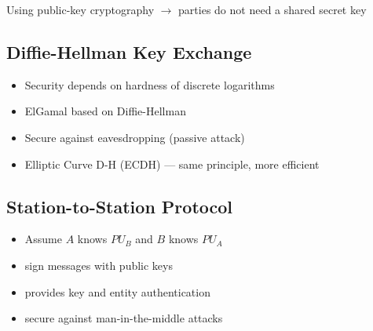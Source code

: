 \documentclass[final]{article}
\begin{document}
Using public-key cryptography $\rightarrow$ parties do not need a shared secret key

\subsection{Diffie-Hellman Key Exchange}
\begin{itemize}[nosep]
    \item Security depends on hardness of discrete logarithms
    \item ElGamal based on Diffie-Hellman
    \item Secure against eavesdropping (passive attack)
    \item Elliptic Curve D-H (ECDH) --- same principle, more efficient
\end{itemize}
\subsection{Station-to-Station Protocol}
\begin{itemize}[nosep]
    \item Assume $A$ knows $PU_B$ and $B$ knows $PU_A$
    \item sign messages with public keys
    \item provides key and entity authentication
    \item secure against man-in-the-middle attacks
\end{itemize}
\end{document}

